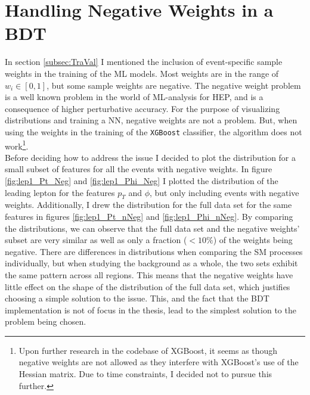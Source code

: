 \section{Handling Negative Weights in a BDT}\label{subsec:negWeights}
In section \ref{subsec:TraVal} I mentioned the inclusion of event-specific sample weights in the training 
of the \ac{ML} models. Most weights are in the range of $w_i \in [0,1]$, but some sample weights are negative.
The negative weight problem is a well known problem in the world of \ac{ML}-analysis for \ac{HEP}, 
and is a consequence of higher perturbative accuracy. For the purpose of visualizing 
distributions and training a \ac{NN}, negative weights are not a problem. But, when using 
the weights in the training of the \verb!XGBoost! classifier, the algorithm does not work\footnote{Upon further research 
in the codebase of XGBoost, it seems as though negative weights are not allowed as they interfere with XGBoost's use 
of the Hessian matrix. Due to time constraints, I decided not to  pursue this further.}.  
\\
Before deciding how to address the issue I decided to plot the distribution for 
a small subset of features for all the events with negative weights.
In figure \ref{fig:lep1_Pt_Neg} and \ref{fig:lep1_Phi_Neg} I plotted the distribution of the leading 
lepton for the features $p_T$ and $\phi$, but only including events with negative weights.
Additionally, I drew the distribution for the full data set for the same features in figures \ref{fig:lep1_Pt_nNeg}
and \ref{fig:lep1_Phi_nNeg}. By comparing the distributions, we can observe that the full data set and the 
negative weights' subset are very similar as well as only a fraction ($<10\%$) of the weights being negative.  
There are differences in distributions when comparing the \ac{SM} processes individually, but when studying the 
background as a whole, the two sets exhibit the same pattern across all regions. This means that the negative 
weights have little effect on the shape of the distribution of the full data set, which justifies choosing 
a simple solution to the issue. This, and the fact that the \ac{BDT} implementation is not of focus in the thesis, 
lead to the simplest solution to the problem being chosen.\\

